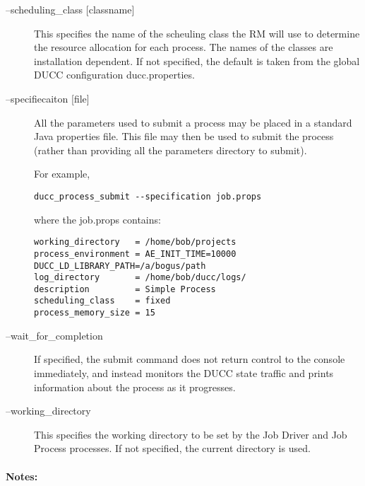 \begin{description}
        \item[--scheduling\_class {[classname]} ] This specifies the name of the scheuling class the
          RM will use to determine the resource allocation for each process. The names of the
          classes are installation dependent. If not specified, the default is taken from the global
          DUCC configuration ducc.properties.

        \item[--specifiecaiton {[file]} ] All the parameters used to submit a process may be placed
          in a standard Java properties file.  This file may then be used to submit the process
          (rather than providing all the parameters directory to submit).
          
          For example, 
\begin{verbatim}
ducc_process_submit --specification job.props 
\end{verbatim}

          where the job.props contains: 
\begin{verbatim}
working_directory   = /home/bob/projects
process_environment = AE_INIT_TIME=10000 DUCC_LD_LIBRARY_PATH=/a/bogus/path 
log_directory       = /home/bob/ducc/logs/ 
description         = Simple Process
scheduling_class    = fixed 
process_memory_size = 15 
\end{verbatim}

        \item[--wait\_for\_completion ] If specified, the submit command does not return control to
          the console immediately, and instead monitors the DUCC state traffic and prints
          information about the process as it progresses.
          
        \item[--working\_directory ] This specifies the working directory to be set by the Job
          Driver and Job Process processes.  If not specified, the current directory is used.

     \end{description}
        
    \paragraph{Notes:}

